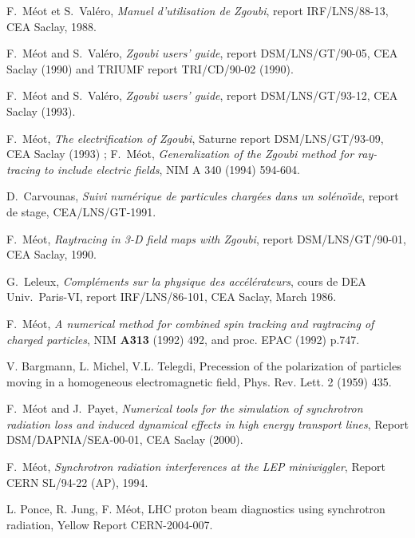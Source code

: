 \begin{thebibliography}{99}  %

 F.~M\'eot et S.~Val\'ero, \textsl{Manuel
d'utilisation de  Zgoubi}, report IRF/LNS/88-13, CEA Saclay, 1988.  

 F.~M\'eot and S.~Val\'ero, \textsl{Zgoubi users' guide}, 
report DSM/LNS/GT/90-05, CEA Saclay (1990) and TRIUMF report TRI/CD/90-02 (1990). 

 F.~M\'eot and S.~Val\'ero, \textsl{Zgoubi users' guide}, 
report DSM/LNS/GT/93-12, CEA Saclay (1993). 

 F.~M\'eot, \textsl{The electrification of Zgoubi}, 
Saturne report DSM/LNS/GT/93-09, CEA Saclay (1993) ; F.~M\'eot, \textsl{
Generalization of the Zgoubi method for ray-tracing to include electric 
fields}, NIM A 340 (1994) 594-604. 

 D.~Carvounas, \textsl{Suivi num\'erique de particules charg\'ees 
dans un sol\'eno\"\i de}, report de stage, CEA/LNS/GT-1991. 

 F.~M\'eot, \textsl{Raytracing in 3-D field maps with Zgoubi}, 
report  DSM/LNS/GT/90-01, CEA Saclay, 1990.

 G.~Leleux, \textsl{Compl\'ements sur la physique des acc\'el\'erateurs}, 
cours de DEA Univ.~Paris-VI,  report  IRF/LNS/86-101, CEA Saclay, March 1986. 

 F.~M\'eot, \textsl{A numerical method for combined spin tracking and 
raytracing of charged particles}, 
NIM \textbf{A313} (1992) 492, and proc. EPAC (1992) p.747. 

 V. Bargmann, L. Michel, V.L. Telegdi,
Precession of the polarization of particles moving in a homogeneous electromagnetic field, 
Phys. Rev. Lett. 2 (1959) 435.

 F.~M\'eot and J.~Payet, 
\textsl{Numerical tools for the simulation of synchrotron radiation  
loss and induced dynamical effects in high energy transport lines},  
Report DSM/DAPNIA/SEA-00-01, CEA Saclay (2000). 

 F.~M\'eot, \textsl{Synchrotron radiation interferences at the LEP miniwiggler}, 
Report CERN SL/94-22 (AP), 1994. 

 L. Ponce,  R. Jung, F. M\'eot, 
LHC proton beam diagnostics using synchrotron radiation,  
Yellow Report CERN-2004-007. 


\end{thebibliography}
